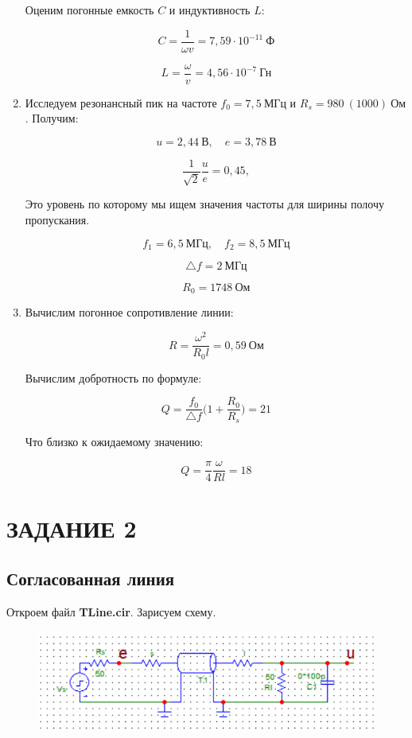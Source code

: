 \documentclass[a4paper, 12pt]{article}%
\begin{document}
\begin{enumerate}
Оценим погонные емкость $C$ и индуктивность $L$:

\[C = \frac{1}{\omega v} = 7,59 \cdot 10^{-11} \: \textit{Ф}\]

\[L = \frac{\omega}{v} = 4,56 \cdot 10^{-7} \: \textit{Гн}\]

\item Исследуем резонансный пик на частоте $f_0 = 7,5 \: \textit{МГц}$ и $R_s = 980 \: (1000) \: \textit{Ом}$. Получим:

\[u = 2,44 \: \textit{В}, \quad e = 3,78 \: \textit{В}\]

\[\frac{1}{\sqrt{2}} \frac{u}{e} = 0,45,\]

Это уровень по которому мы ищем значения частоты для ширины полочу пропускания.

\[f_1 = 6,5 \: \textit{МГц}, \quad f_2 = 8,5 \: \textit{МГц}\]

\[\bigtriangleup f = 2 \: \textit{МГц}\]

\[R_0 = 1748 \: \textit{Ом}\]

\item Вычислим погонное сопротивление линии:

\[R = \frac{\omega^2}{R_0 l} = 0,59 \: \textit{Ом}\]

Вычислим добротность по формуле:

\[Q = \frac{f_0}{\bigtriangleup f} \Big(1 + \frac{R_0}{R_s}\Big) = 21\]

Что близко к ожидаемому значению:

\[Q = \frac{\pi}{4} \frac{\omega}{Rl} = 18\]

\end{enumerate}

\section*{ЗАДАНИЕ 2}

\subsection*{Согласованная линия} Откроем файл \textbf{TLine.cir}. Зарисуем схему.

\begin{figure}[h!]
\centering
\includegraphics[scale=1]{images/TLine.png}
\label{fig:Image1}
\end{figure}
\end{document}
